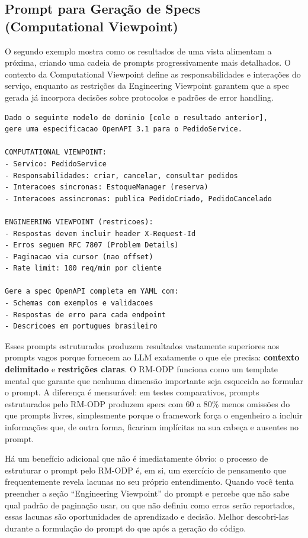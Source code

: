 \subsection{Prompt para Geração de Specs (Computational Viewpoint)}

O segundo exemplo mostra como os resultados de uma vista alimentam a próxima,
criando uma cadeia de prompts progressivamente mais detalhados. O contexto da
Computational Viewpoint define as responsabilidades e interações do serviço,
enquanto as restrições da Engineering Viewpoint garantem que a spec gerada já
incorpora decisões sobre protocolos e padrões de error handling.

\begin{lstlisting}[language={}, caption={Prompt estruturado usando a Computational Viewpoint}]
Dado o seguinte modelo de dominio [cole o resultado anterior],
gere uma especificacao OpenAPI 3.1 para o PedidoService.

COMPUTATIONAL VIEWPOINT:
- Servico: PedidoService
- Responsabilidades: criar, cancelar, consultar pedidos
- Interacoes sincronas: EstoqueManager (reserva)
- Interacoes assincronas: publica PedidoCriado, PedidoCancelado

ENGINEERING VIEWPOINT (restricoes):
- Respostas devem incluir header X-Request-Id
- Erros seguem RFC 7807 (Problem Details)
- Paginacao via cursor (nao offset)
- Rate limit: 100 req/min por cliente

Gere a spec OpenAPI completa em YAML com:
- Schemas com exemplos e validacoes
- Respostas de erro para cada endpoint
- Descricoes em portugues brasileiro
\end{lstlisting}

Esses prompts estruturados produzem resultados vastamente superiores aos prompts
vagos porque fornecem ao LLM exatamente o que ele precisa: \textbf{contexto
delimitado} e \textbf{restrições claras}. O RM-ODP funciona como um template
mental que garante que nenhuma dimensão importante seja esquecida ao formular
o prompt. A diferença é mensurável: em testes comparativos, prompts estruturados
pelo RM-ODP produzem specs com 60 a 80\% menos omissões do que prompts livres,
simplesmente porque o framework força o engenheiro a incluir informações que,
de outra forma, ficariam implícitas na sua cabeça e ausentes no prompt.

Há um benefício adicional que não é imediatamente óbvio: o processo de estruturar
o prompt pelo RM-ODP é, em si, um exercício de pensamento que frequentemente
revela lacunas no seu próprio entendimento. Quando você tenta preencher a seção
``Engineering Viewpoint'' do prompt e percebe que não sabe qual padrão de paginação
usar, ou que não definiu como erros serão reportados, essas lacunas são
oportunidades de aprendizado e decisão. Melhor descobri-las durante a
formulação do prompt do que após a geração do código.


